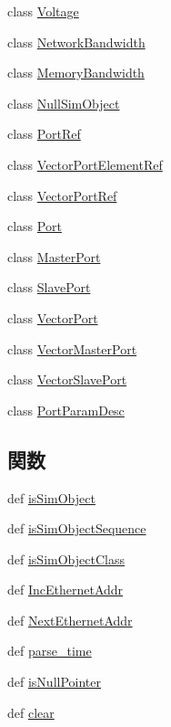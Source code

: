 \begin{DoxyCompactItemize}
\item 
class \hyperlink{classm5_1_1params_1_1Voltage}{Voltage}
\item 
class \hyperlink{classm5_1_1params_1_1NetworkBandwidth}{NetworkBandwidth}
\item 
class \hyperlink{classm5_1_1params_1_1MemoryBandwidth}{MemoryBandwidth}
\item 
class \hyperlink{classm5_1_1params_1_1NullSimObject}{NullSimObject}
\item 
class \hyperlink{classm5_1_1params_1_1PortRef}{PortRef}
\item 
class \hyperlink{classm5_1_1params_1_1VectorPortElementRef}{VectorPortElementRef}
\item 
class \hyperlink{classm5_1_1params_1_1VectorPortRef}{VectorPortRef}
\item 
class \hyperlink{classm5_1_1params_1_1Port}{Port}
\item 
class \hyperlink{classm5_1_1params_1_1MasterPort}{MasterPort}
\item 
class \hyperlink{classm5_1_1params_1_1SlavePort}{SlavePort}
\item 
class \hyperlink{classm5_1_1params_1_1VectorPort}{VectorPort}
\item 
class \hyperlink{classm5_1_1params_1_1VectorMasterPort}{VectorMasterPort}
\item 
class \hyperlink{classm5_1_1params_1_1VectorSlavePort}{VectorSlavePort}
\item 
class \hyperlink{classm5_1_1params_1_1PortParamDesc}{PortParamDesc}
\end{DoxyCompactItemize}
\subsection*{関数}
\begin{DoxyCompactItemize}
\item 
def \hyperlink{namespacem5_1_1params_a3b124725e754deabb6f2a6bbe1940c9c}{isSimObject}
\item 
def \hyperlink{namespacem5_1_1params_a0f12664353778764c21b1828af5ccdf2}{isSimObjectSequence}
\item 
def \hyperlink{namespacem5_1_1params_ac12f441c590f82fbf6dad498232b5508}{isSimObjectClass}
\item 
def \hyperlink{namespacem5_1_1params_ae5a3c9a388a74d64dcf5045a04d3aaee}{IncEthernetAddr}
\item 
def \hyperlink{namespacem5_1_1params_acc7cdbc69749307ecd631eef8535ff4b}{NextEthernetAddr}
\item 
def \hyperlink{namespacem5_1_1params_ab8f768c4d90440f33c738a4ca495db06}{parse\_\-time}
\item 
def \hyperlink{namespacem5_1_1params_aeb1d02adba143b515f1132bd9b873163}{isNullPointer}
\item 
def \hyperlink{namespacem5_1_1params_adba0da38f060e3d71fae93062019832a}{clear}
\end{DoxyCompactItemize}
